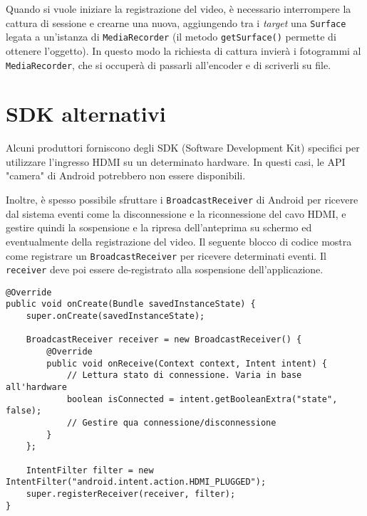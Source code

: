 Quando si vuole iniziare la registrazione del video, è necessario interrompere la cattura di sessione e crearne una nuova, aggiungendo tra i \emph{target} una \texttt{Surface} legata a un'istanza di \texttt{MediaRecorder} (il metodo \texttt{getSurface()} permette di ottenere l'oggetto). In questo modo la richiesta di cattura invierà i fotogrammi al \texttt{MediaRecorder}, che si occuperà di passarli all'encoder e di scriverli su file.

\section{SDK alternativi}
\label{sec:hdmi_sdk}

Alcuni produttori forniscono degli SDK (Software Development Kit) specifici per utilizzare l'ingresso HDMI su un determinato hardware. In questi casi, le API "camera" di Android potrebbero non essere disponibili.

Inoltre, è spesso possibile sfruttare i \texttt{BroadcastReceiver} di Android per ricevere dal sistema eventi come la disconnessione e la riconnessione del cavo HDMI, e gestire quindi la sospensione e la ripresa dell'anteprima su schermo ed eventualmente della registrazione del video. Il seguente blocco di codice mostra come registrare un \texttt{BroadcastReceiver} per ricevere determinati eventi. Il \texttt{receiver} deve poi essere de-registrato alla sospensione dell'applicazione.


\begin{verbatim}
@Override
public void onCreate(Bundle savedInstanceState) {
    super.onCreate(savedInstanceState);

    BroadcastReceiver receiver = new BroadcastReceiver() {
        @Override
        public void onReceive(Context context, Intent intent) {
            // Lettura stato di connessione. Varia in base all'hardware
            boolean isConnected = intent.getBooleanExtra("state", false);
            // Gestire qua connessione/disconnessione
        }
    };
    
    IntentFilter filter = new IntentFilter("android.intent.action.HDMI_PLUGGED");
    super.registerReceiver(receiver, filter);
}
\end{verbatim}

